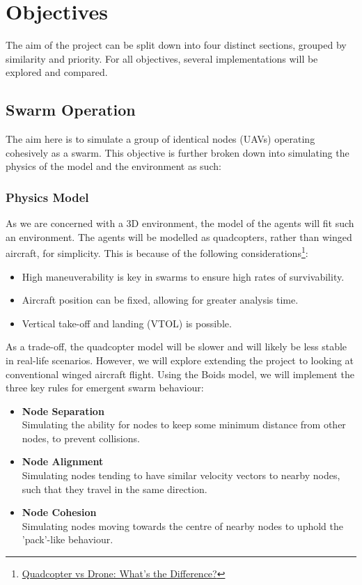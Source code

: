 \documentclass{article}
\begin{document}
\section{Objectives}
The aim of the project can be split down into four distinct sections, grouped by similarity and priority. For all objectives, several implementations will be explored and compared.

\subsection{Swarm Operation}
The aim here is to simulate a group of identical nodes (UAVs) operating cohesively as a swarm. This objective is further broken down into simulating the physics of the model and the environment as such:

\subsubsection{Physics Model}
As we are concerned with a 3D environment, the model of the agents will fit such an environment. The agents will be modelled as quadcopters\cite{Khan2014QuadcopterFD}, rather than winged aircraft, for simplicity. This is because of the following considerations\footnote{\href{https://www.adorama.com/alc/quadcopter-vs-drone/}{Quadcopter vs Drone: What's the Difference?}}:
\begin{itemize}
    \item High maneuverability is key in swarms to ensure high rates of survivability.
    \item Aircraft position can be fixed, allowing for greater analysis time.
    \item Vertical take-off and landing (VTOL) is possible.
\end{itemize}

As a trade-off, the quadcopter model will be slower and will likely be less stable in real-life scenarios. However, we will explore extending the project to looking at conventional winged aircraft flight. Using the Boids model, we will implement the three key rules for emergent swarm behaviour:
\begin{itemize}
    \item \textbf{Node Separation} \\ 
    Simulating the ability for nodes to keep some minimum distance from other nodes, to prevent collisions.
    \item \textbf{Node Alignment} \\
    Simulating nodes tending to have similar velocity vectors to nearby nodes, such that they travel in the same direction.
    \item \textbf{Node Cohesion} \\
    Simulating nodes moving towards the centre of nearby nodes to uphold the 'pack'-like behaviour.
\end{itemize}
\end{document}
